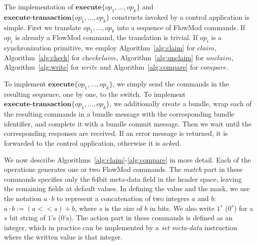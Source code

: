 \documentclass[conference]{sigcomm-alternate}
\newcommand{\concat}[0]{\cdot}
\newcommand{\exec}{\textbf{execute}}
\newcommand{\execatomic}{\textbf{execute-transaction}}
\newcommand{\ack}{\textit{ack}}
\newcommand{\ones}[1]{1^{#1}}
\newcommand{\zeros}[1]{0^{#1}}
\begin{document}
The implementation of $\exec\{op_1,\ldots,op_k\}$ and
$\execatomic\{op_1,\ldots,op_k\}$ constructs
invoked by a control application is simple.
First we translate  $op_1,\ldots,op_k$ into a sequence of FlowMod
commands. If $op_i$ is already a FlowMod command, the translation is
trivial. If $op_i$ is a synchronization primitive, we employ
Algorithm~\ref{alg:claim} for $\textit{claim}$,
Algorithm~\ref{alg:check} for $\textit{checkclaim}$,
Algorithm~\ref{alg:unclaim}
for $\textit{unclaim}$,
Algorithm~\ref{alg:write} for $\textit{write}$ and
Algorithm~\ref{alg:compare} for $\textit{compare}$.

To implement  $\exec\{op_1,\ldots,op_k\}$, we simply send the commands in
the resulting sequence, one by one, to the switch.
%
To implement  $\execatomic\{op_1,\ldots,op_k\}$, we
additionally create a bundle, wrap each of the resulting commands in a
bundle message with the corresponding bundle identifier, and complete it
with a bundle commit message.
Then we wait until the
corresponding responses are received.
If an error message is returned,
it is forwarded to the control application,
otherwise it is $\ack$ed.

We now describe Algorithms~\ref{alg:claim}-\ref{alg:compare} in more
detail.
Each of the operations generates one or two FlowMod commands.
The \textit{match} part in these commands specifies only the $64$bit meta-data
field in the header space, leaving the remaining fields at default
values.
In defining the value and the mask,
we
use the notation $a\concat b$ to represent a concatenation of two
 integers $a$ and $b$: $a\concat b := (a<<s)+b$, where $s$ is the size of $b$ in bits.
We also write \texttt{$\ones{s}$} (\texttt{$\zeros{s}$}) for  a $s$ bit 
string of $1$'s ($0$'s).
%
The action part in these commands is defined as an integer, which in
practice can be implemented by a \emph{set meta-data} instruction where the written value is that integer.
\end{document}
